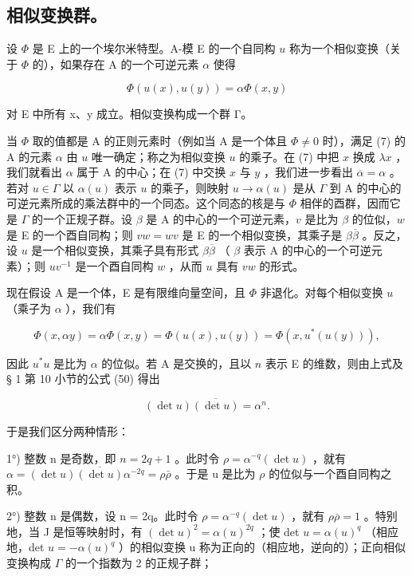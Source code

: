 \subsection{相似变换群。}

设 \(\Phi\) 是 E 上的一个埃尔米特型。A-模 E 的一个自同构 \(u\) 称为一个相似变换（关于 \(\Phi\) 的），如果存在 A 的一个可逆元素 \(\alpha\) 使得

\[
\Phi (u (x), u (y)) = \alpha \Phi (x, y)\tag{7}
\]

对 E 中所有 x、y 成立。相似变换构成一个群 Γ。

当 \(\Phi\) 取的值都是 A 的正则元素时（例如当 A 是一个体且 \(\Phi \neq 0\) 时），满足 (7) 的 A 的元素 \(\alpha\) 由 \(u\) 唯一确定；称之为相似变换 \(u\) 的乘子。在 (7) 中把 \(x\) 换成 \(\lambda x\) ，我们就看出 \(\alpha\) 属于 A 的中心；在 (7) 中交换 \(x\) 与 \(y\) ，我们进一步看出 \(\overline{\alpha} = \alpha\) 。若对 \(u \in \Gamma\) 以 \(\alpha(u)\) 表示 \(u\) 的乘子，则映射 \(u \to \alpha(u)\) 是从 \(\Gamma\) 到 A 的中心的可逆元素所成的乘法群中的一个同态。这个同态的核是与 \(\Phi\) 相伴的酉群，因而它是 \(\Gamma\) 的一个正规子群。设 \(\beta\) 是 A 的中心的一个可逆元素，\(v\) 是比为 \(\beta\) 的位似，\(w\) 是 E 的一个酉自同构；则 \(vw = wv\) 是 E 的一个相似变换，其乘子是 \(\beta\overline{\beta}\) 。反之，设 \(u\) 是一个相似变换，其乘子具有形式 \(\beta\overline{\beta}\) （ \(\beta\) 表示 A 的中心的一个可逆元素）；则 \(uv^{-1}\) 是一个酉自同构 \(w\) ，从而 \(u\) 具有 \(vw\) 的形式。

现在假设 A 是一个体，E 是有限维向量空间，且 \(\Phi\) 非退化。对每个相似变换 \(u\) （乘子为 \(\alpha\) ），我们有

\[
\Phi (x, \alpha y) = \alpha \Phi (x, y) = \Phi (u (x), u (y)) = \Phi (x, u ^ {*} (u (y))),
\]

因此 \(u^*u\) 是比为 \(\alpha\) 的位似。若 A 是交换的，且以 \(n\) 表示 E 的维数，则由上式及 § 1 第 10 小节的公式 (50) 得出

\[
(\det u) \overline {{(\det u)}} = \alpha^ {n}.\tag{8}
\]

于是我们区分两种情形：

1°) 整数 n 是奇数，即 \(n = 2q + 1\) 。此时令 \(\rho = \alpha^{-q}(\det u)\) ，就有 \(\alpha = (\det u) \overline{(\det u)} \alpha^{-2q} = \rho \bar{\rho}\) 。于是 u 是比为 \(\rho\) 的位似与一个酉自同构之积。

2°) 整数 n 是偶数，设 n = 2q。此时令 \(\rho = \alpha^{-q}(\det u)\) ，就有 \(\rho\bar{\rho} = 1\) 。特别地，当 J 是恒等映射时，有 \((\det u)^{2} = \alpha(u)^{2q}\) ；使 det \(u = \alpha(u)^{q}\) （相应地，det \(u = -\alpha(u)^{q}\) ）的相似变换 u 称为正向的（相应地，逆向的）；正向相似变换构成 \(\Gamma\) 的一个指数为 2 的正规子群；

